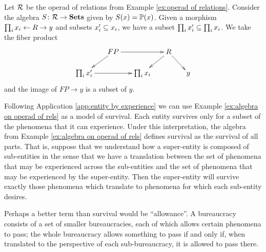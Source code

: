 \begin{example}\label{ex:algebra on operad of rels}

Let $\mcR$ be the operad of relations from Example \ref{ex:operad of relations}. Consider the algebra $S\taking\mcR\to\Sets$ given by $S(x)=\PP(x)$. Given a morphism $\prod_ix_i\from R\to y$ and subsets $x_i'\ss x_i$, we have a subset $\prod_ix_i'\ss\prod_ix_i$. We take the fiber product
$$\xymatrix@=15pt{&FP\ar[rr]\ar[ld]&&R\ar[ld]\ar[rd]\\\prod_ix_i'\ar[rr]&&\prod_ix_i&&y}$$
and the image of $FP\to y$ is a subset of $y$. 

\end{example}

\begin{application}\label{app:desire}

Following Application \ref{app:entity by experience} we can use Example \ref{ex:algebra on operad of rels} as a model of survival. Each entity survives only for a subset of the phenomena that it can experience. Under this interpretation, the algebra from Example \ref{ex:algebra on operad of rels} defines survival as the survival of all parts. That is, suppose that we understand how a super-entity is composed of sub-entities in the sense that we have a translation between the set of phenomena that may be experienced across the sub-entities and the set of phenomena that may be experienced by the super-entity. Then the super-entity will survive exactly those phenomena which translate to phenomena for which each sub-entity desires. 

Perhaps a better term than survival would be “allowance”. A bureaucracy consists of a set of smaller bureaucracies, each of which allows certain phenomena to pass; the whole bureaucracy allows something to pass if and only if, when translated to the perspective of each sub-bureaucracy, it is allowed to pass there.

\end{application}

